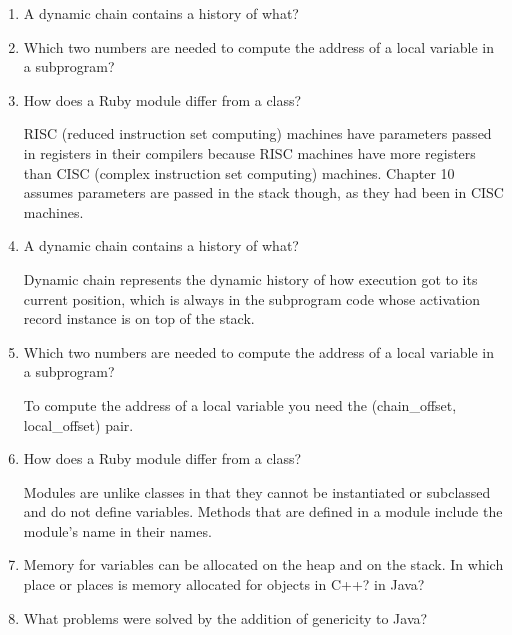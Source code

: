 \begin{enumerate}
  \item A dynamic chain contains a history of what?

  \item Which two numbers are needed to compute
    the address of a local variable in a subprogram?

  \item How does a Ruby module differ from a class?

\begin{answer}
    RISC (reduced instruction set computing) machines have parameters
    passed in registers in their compilers because RISC machines have
    more registers than CISC (complex instruction set computing)
    machines. Chapter 10 assumes parameters are passed in the stack
    though, as they had been in CISC machines.
    \end{answer}

  \item A dynamic chain contains a history of what?

\begin{answer}
    Dynamic chain represents the dynamic history of how execution got
    to its current position, which is always in the subprogram code
    whose activation record instance is on top of the stack.
    \end{answer}
 

  \item Which two numbers are needed to compute
    the address of a local variable in a subprogram?

\begin{answer}
    To compute the address of a local variable you need the (chain\_offset, 
local\_offset) pair.
    \end{answer}


  \item How does a Ruby module differ from a class?

    \begin{answer}
    Modules are unlike classes in that they cannot be instantiated or
    subclassed and do not define variables. Methods that are defined
    in a module include the module’s name in their names.
    \end{answer}

  \item Memory for variables can be allocated on the heap
    and on the stack. In which place or places is memory
    allocated for objects in C++? in Java?

  \item What problems were solved by the addition
    of genericity to Java?


\end{enumerate}

